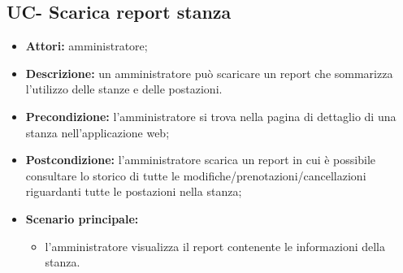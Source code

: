 \subsection{UC- Scarica report stanza}
\begin{itemize}
    \item \textbf{Attori:} amministratore;
    \item \textbf{Descrizione:} un amministratore pu\`{o} scaricare un report che sommarizza l'utilizzo delle stanze e delle postazioni.
    \item \textbf{Precondizione:} l'amministratore si trova nella pagina di dettaglio di una stanza nell'applicazione web;
    \item \textbf{Postcondizione:} l'amministratore scarica un report in cui \`{e} possibile consultare lo storico di tutte le modifiche/prenotazioni/cancellazioni riguardanti tutte le postazioni nella stanza;
    \item \textbf{Scenario principale:}
    \begin{itemize}
        \item l'amministratore visualizza il report contenente le informazioni della stanza.
    \end{itemize}
\end{itemize}